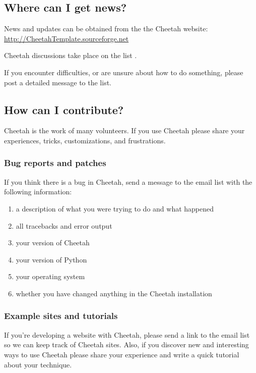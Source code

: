 \subsection{Where can I get news?}
\label{intro.news}

News and updates can be obtained from the the Cheetah website:
\url{http://CheetahTemplate.sourceforge.net}

Cheetah discussions take place on the list
.

If you encounter difficulties, or are unsure about how to do something,
please post a detailed message to the list.

\subsection{How can I contribute?}
\label{intro.contribute}

Cheetah is the work of many volunteers.  If you use Cheetah please share your
experiences, tricks, customizations, and frustrations.

\subsubsection{Bug reports and patches}

If you think there is a bug in Cheetah, send a message to the email list
with the following information:

\begin{enumerate}
\item a description of what you were trying to do and what happened
\item all tracebacks and error output
\item your version of Cheetah
\item your version of Python
\item your operating system
\item whether you have changed anything in the Cheetah installation
\end{enumerate}

\subsubsection{Example sites and tutorials}
If you're developing a website with Cheetah, please send a link to the
email list so we can keep track of Cheetah sites.  Also, if you discover
new and interesting ways to use Cheetah please share your experience and
write a quick tutorial about your technique.

